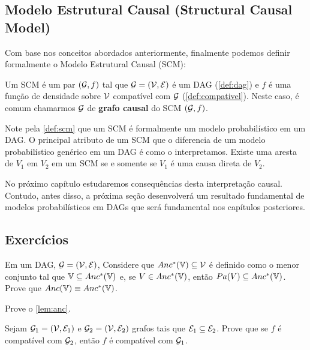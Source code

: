\subsection{Modelo Estrutural Causal (Structural Causal Model)}

Com base nos conceitos abordados anteriormente,
finalmente podemos definir formalmente
o Modelo Estrutural Causal (SCM):

\begin{definition}
 \label{def:scm}
 Um SCM é um par $({\mathcal G},f)$ tal que
 ${\mathcal G} = ({\mathcal V}, {\mathcal E})$ é um DAG (\cref{def:dag}) e
 $f$ é uma função de densidade sobre ${\mathcal V}$
 compatível com ${\mathcal G}$ (\cref{def:compativel}).
 Neste caso, é comum chamarmos ${\mathcal G}$ de
 \textbf{grafo causal} do SCM $({\mathcal G},f)$.
\end{definition}

Note pela \cref{def:scm} que
um SCM é formalmente um modelo probabilístico em um DAG.
O principal atributo de um SCM que 
o diferencia de um modelo probabilístico genérico em um DAG é
como o interpretamos.
Existe uma aresta de $V_1$ em $V_2$ em um SCM
se e somente se $V_1$ é uma causa direta de $V_2$.

No próximo capítulo estudaremos consequências desta interpretação causal.
Contudo, antes disso, a próxima seção desenvolverá
um resultado fundamental de modelos probabilísticos em DAGs que
será fundamental nos capítulos posteriores.

\subsection{Exercícios}

\begin{exercise}
 Em um DAG, ${\mathcal G} = ({\mathcal V}, {\mathcal E})$,
 Considere que $Anc^*({\mathbb V}) \subseteq {\mathcal V}$ é
 definido como o menor conjunto tal que
 ${\mathbb V} \subseteq Anc^*({\mathbb V})$ e,
 se $V \in Anc^*({\mathbb V})$, então
 $Pa(V) \subseteq Anc^*({\mathbb V})$.
 Prove que $Anc({\mathbb V}) \equiv Anc^*({\mathbb V})$.
\end{exercise}

\begin{exercise} 
 Prove o \cref{lem:anc}.
\end{exercise}

\begin{exercise}
 Sejam ${\mathcal G}_1 = ({\mathcal V}, {\mathcal E}_1)$ e
 ${\mathcal G}_2 = ({\mathcal V}, {\mathcal E}_2)$ grafos
 tais que ${\mathcal E}_1 \subseteq {\mathcal E}_2$.
 Prove que se 
 $f$ é compatível com ${\mathcal G}_2$, então 
 $f$ é compatível com ${\mathcal G}_1$.
\end{exercise}

